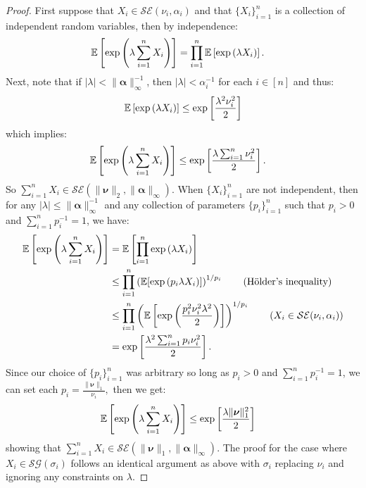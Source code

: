 \begin{proof}
First suppose that $X_i \in \mathcal{SE}(\nu_i, \alpha_i)$ and that $\{X_i\}_{i=1}^n$ is a collection of independent random variables, then by independence:
\begin{align*}
    \mathbb{E}\left[\exp\left(\lambda \sum_{i=1}^n X_i\right)\right] &=  \prod_{i=1}^n \mathbb{E}\left[\exp\left(\lambda X_i\right)\right].
\end{align*}
Next, note that if $|\lambda| < \lVert \boldsymbol{\alpha}\rVert^{-1}_{\infty}$, then $|\lambda| < \alpha_i^{-1}$ for each $i \in [n]$ and thus:
\begin{align*}
    \mathbb{E}\left[\exp\left(\lambda X_i\right)\right] \leq \exp\left[\frac{\lambda^2\nu_{i}^2}{2}\right]
\end{align*}
which implies:
\begin{align*}
    \mathbb{E}\left[\exp\left(\lambda \sum_{i=1}^n X_i\right)\right] &\leq \exp\left[\frac{\lambda\sum_{i=1}^n\nu^2_i}{2}\right].
\end{align*}
So $\sum_{i=1}^n X_i \in \mathcal{SE}(\lVert \boldsymbol{\nu}\rVert_2, \lVert \boldsymbol{\alpha}\rVert_\infty)$. When $\{X_i\}_{i=1}^n$ are not independent, then for any $|\lambda| \leq \lVert \boldsymbol{\alpha}\rVert^{-1}_{\infty}$ and any collection of parameters $\{p_i\}_{i=1}^n$ such that $p_i > 0$ and $\sum_{i=1}^n p_i^{-1} = 1$, we have:
\begin{align*}
    \E\left[\exp\left(\lambda \sum_{i=1}^n X_i\right)\right] &= \E\left[ \prod_{i=1}^n \exp\left(\lambda X_i\right)\right] \\
    &\leq \prod_{i=1}^n \left(\E[\exp\left(p_i \lambda X_i\right)]\right)^{1/p_i} \tag{H\"older's inequality} \\
    &\leq \prod_{i=1}^n \left(\E\left[\exp\left(\frac{p^2_i\nu_i^2 \lambda^2}{2}\right)\right]\right)^{1/p_i} \tag{$X_i \in \mathcal{SE}(\nu_i,\alpha_i)$} \\
    &= \exp\left[\frac{\lambda^2\sum_{i=1}^n p_i \nu_i^2}{2}\right].
\end{align*}
Since our choice of $\{p_i\}_{i=1}^n$ was arbitrary so long as $p_i > 0$ and $\sum_{i=1}^n p_i^{-1} = 1$, we can set each $p_i = \frac{\lVert\boldsymbol{\nu}\rVert_1}{\nu_i},$ then we get:
\begin{align*}
    \mathbb{E}\left[\exp\left(\lambda \sum_{i=1}^n X_i\right)\right] &\leq \exp\left[\frac{\lambda \lVert \boldsymbol{\nu}\rVert^2_1}{2}\right]
\end{align*}
showing that $\sum_{i=1}^n X_i \in \mathcal{SE}(\lVert\boldsymbol{\nu}\rVert_1, \lVert \boldsymbol{\alpha}\rVert_\infty).$ The proof for the case where $X_i \in \mathcal{SG}(\sigma_i)$ follows an identical argument as above with $\sigma_i$ replacing $\nu_i$ and ignoring any constraints on $\lambda$. 
\end{proof}

